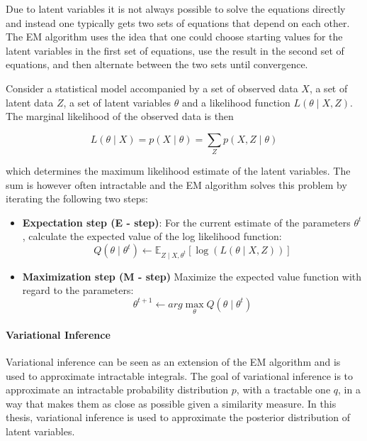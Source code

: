 \documentclass[12pt]{report}
\begin{document}
Due to latent variables it is not always possible to solve the equations directly and 
instead one typically gets two sets of equations that depend on each other. The EM 
algorithm uses the idea that one could choose starting values for the latent variables 
in the first set of equations, use the result in the second set of equations, and then 
alternate between the two sets until convergence.

Consider a statistical model accompanied by a set of observed data $X$, a set of 
latent data $Z$, a set of latent variables $\theta$ and a likelihood function 
$L(\theta \mid X, Z)$. The marginal likelihood of the observed data is then

\begin{equation}
L(\theta \mid X) = p(X \mid \theta) = \sum\limits_{Z} p(X, Z \mid \theta)
\end{equation}

which determines the maximum likelihood estimate of the latent variables. The sum is 
however often intractable and the EM algorithm solves this problem by iterating the 
following two steps:

\begin{itemize}
\item \textbf{Expectation step (E - step)}: For the current estimate of the parameters 
$\theta^t$, calculate the expected value of the log likelihood function:
\begin{equation}
Q(\theta \mid \theta^t) \leftarrow \mathbb{E}_{Z \mid X, \theta^t} [\log(L(\theta \mid X, Z))]
\end{equation}
\item \textbf{Maximization step (M - step)} Maximize the expected value function 
with regard to the parameters:
\begin{equation}
\theta^{t + 1} \leftarrow arg \max\limits_{\theta} Q(\theta \mid \theta^t)
\end{equation}
\end{itemize}

\paragraph{Variational Inference}

Variational inference can be seen as an extension of the EM algorithm and is used to 
approximate intractable integrals. The goal of variational inference is to approximate 
an intractable probability distribution $p$, with a tractable one $q$, in a way that 
makes them as close as possible given a similarity measure. In this thesis, 
variational inference is used to approximate the posterior distribution of latent 
variables. 
\end{document}
